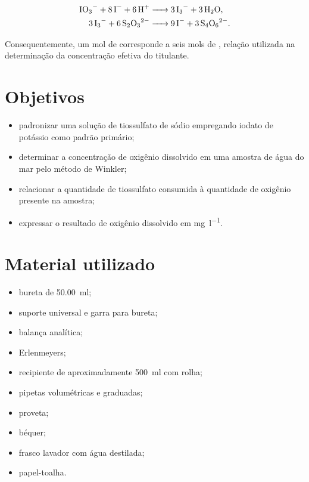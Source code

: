 \documentclass[a4paper,12pt]{article}
\begin{document}
\begin{align}
\ce{IO3- + 8I- + 6H+ &-> 3I3- + 3H2O},\\
\ce{3I3- + 6S2O3^2- &-> 9I- + 3S4O6^2-}.
\end{align}

Consequentemente, um mol de  corresponde a seis mols de
, relação utilizada na determinação da concentração efetiva do
titulante.

\section{Objetivos}

\begin{itemize}
  \item padronizar uma solução de tiossulfato de sódio empregando iodato de
        potássio como padrão primário;
  \item determinar a concentração de oxigênio dissolvido em uma amostra de
        água do mar pelo método de Winkler;
  \item relacionar a quantidade de tiossulfato consumida à quantidade de
        oxigênio presente na amostra;
  \item expressar o resultado de oxigênio dissolvido em
        \si{\milli\gram\per\litre}.
\end{itemize}

\section{Material utilizado}

\begin{itemize}
  \item bureta de \qty{50.00}{\milli\litre};
  \item suporte universal e garra para bureta;
  \item balança analítica;
  \item Erlenmeyers;
  \item recipiente de aproximadamente \qty{500}{\milli\litre} com rolha;
  \item pipetas volumétricas e graduadas;
  \item proveta;
  \item béquer;
  \item frasco lavador com água destilada;
  \item papel-toalha.
\end{itemize}
\end{document}
